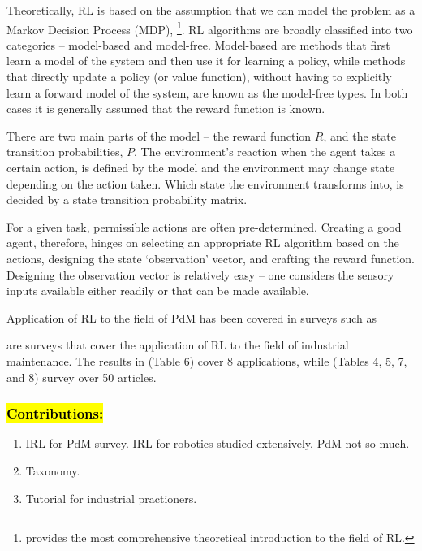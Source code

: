 \documentclass{article}
\newcommand{\hlc}[2][blue!10]{{\colorlet{foo}{#1} \sethlcolor{foo}\hl{#2}}}
\begin{document}
Theoretically, RL is based on the assumption that we can model the problem as a Markov Decision Process (MDP), \citep{sutton2018}\footnote{\citet{sutton2018} provides the most comprehensive theoretical introduction to the field of RL.}. 
RL algorithms are broadly classified into two categories -- model-based and model-free. Model-based are methods that first learn a model of the system and then use it for learning a policy, while methods that directly update a policy (or value function), without having to explicitly learn a forward model of the system, are known as the model-free types. In both cases it is generally assumed that the reward function is known.

There are two main parts of the model -- the reward function $R$, and the state transition probabilities, $P$. The environment's reaction when the agent takes a certain action, is defined by the model and the environment may change state depending on the action taken. Which state the environment transforms into, is decided by a state transition probability matrix. 

For a given task, permissible actions are often pre-determined. Creating a good agent, therefore, hinges on selecting an appropriate RL algorithm based on the actions, designing the state `observation' vector, and crafting the reward function. Designing the observation vector is relatively easy -- one considers the sensory inputs available either readily or that can be made available. 

Application of RL to the field of PdM has been covered in surveys such as \cite{Erhan2021Smart, Ren2021, Barja-Martinez2021, panzer2022, siraskar2023}

\cite{panzer2022, siraskar2023} are surveys that cover the application of RL to the field of industrial maintenance. The results in \cite{panzer2022} (Table 6) cover 8 applications, while \cite{siraskar2023} (Tables 4, 5, 7, and 8) survey over 50 articles.

\subsubsection*{\hlc{Contributions:}}
\begin{enumerate}
	\item IRL for PdM survey. IRL for robotics studied extensively. PdM not so much.
	\item Taxonomy.
	\item Tutorial for industrial practioners.
\end{enumerate}
\end{document}

